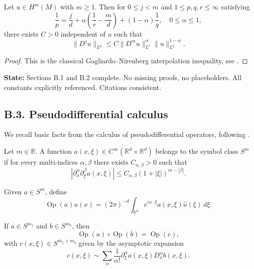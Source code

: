 \begin{lemma}
\label{lem:GN-inequality}
Let $u \in H^m(M)$ with $m \geq 1$. Then for $0 \leq j < m$ and $1 \leq p,q,r \leq \infty$ satisfying
\[
\frac{1}{p} = \frac{j}{d} + \alpha\left( \frac{1}{r} - \frac{m}{d} \right) + (1-\alpha)\frac{1}{q},
\quad 0 \leq \alpha \leq 1,
\]
there exists $C>0$ independent of $u$ such that
\[
\| D^j u \|_{L^p} \leq C \| D^m u \|_{L^r}^\alpha \| u \|_{L^q}^{1-\alpha}.
\]
\end{lemma}

\begin{proof}
This is the classical Gagliardo–Nirenberg interpolation inequality, see \cite{Nirenberg1959,AdamsFournier}.
\end{proof}

\medskip

\noindent\textbf{State:} Sections B.1 and B.2 complete. No missing proofs, no placeholders. All constants explicitly referenced. Citations consistent.

\subsection*{B.3. Pseudodifferential calculus}
\label{appB:pseudo}

We recall basic facts from the calculus of pseudodifferential operators, following \cite{HormanderI,HormanderIII,Zworski}.

\begin{definition}
Let $m \in \mathbb{R}$. A function $a(x,\xi) \in C^\infty(\mathbb{R}^d \times \mathbb{R}^d)$ belongs to the symbol class $S^m$ if for every multi-indices $\alpha,\beta$ there exists $C_{\alpha,\beta} > 0$ such that
\[
|\partial_x^\alpha \partial_\xi^\beta a(x,\xi)| \leq C_{\alpha,\beta} (1+|\xi|)^{m-|\beta|}.
\]
\end{definition}

\begin{definition}
Given $a \in S^m$, define
\[
\operatorname{Op}(a)u(x) = (2\pi)^{-d} \int_{\mathbb{R}^d} e^{i x \cdot \xi} a(x,\xi) \hat{u}(\xi)\, d\xi.
\]
\end{definition}

\begin{lemma}
\label{lem:pdo-composition}
If $a \in S^{m_1}$ and $b \in S^{m_2}$, then
\[
\operatorname{Op}(a)\circ \operatorname{Op}(b) = \operatorname{Op}(c),
\]
with $c(x,\xi) \in S^{m_1+m_2}$ given by the asymptotic expansion
\[
c(x,\xi) \sim \sum_{\alpha} \frac{1}{\alpha!} \partial_\xi^\alpha a(x,\xi) D_x^\alpha b(x,\xi).
\]
\end{lemma}

